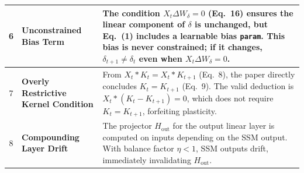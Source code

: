\begin{table}[ht]
{\begin{tabular}{clp{10cm}}
        \midrule
        6 & \textbf{Unconstrained Bias Term} & The condition $X_t \Delta W_\delta = 0$ (Eq.~16) ensures the linear component of $\delta$ is unchanged, but Eq.~(1) includes a learnable bias \texttt{param}. This bias is never constrained; if it changes, $\delta_{t+1} \neq \delta_t$ even when $X_t \Delta W_\delta = 0$. \\
        \midrule
        7 & \textbf{Overly Restrictive Kernel Condition} & From $X_t * K_t = X_t * K_{t+1}$ (Eq.~8), the paper directly concludes $K_t = K_{t+1}$ (Eq.~9). The valid deduction is $X_t * (K_t - K_{t+1}) = 0$, which does not require $K_t = K_{t+1}$, forfeiting plasticity. \\
        \midrule
        8 & \textbf{Compounding Layer Drift} & The projector $H_{\text{out}}$ for the output linear layer is computed on inputs depending on the SSM output. With balance factor $\eta < 1$, SSM outputs drift, immediately invalidating $H_{\text{out}}$. \\
        \bottomrule
    \end{tabular}%
    }
\end{table}
